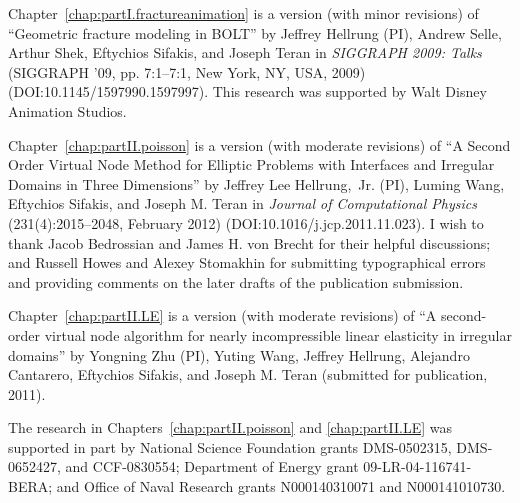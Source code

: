 {Chapter~\ref{chap:partI.fractureanimation} is a version (with minor revisions) of ``Geometric fracture modeling in BOLT'' by Jeffrey Hellrung (PI), Andrew Selle, Arthur Shek, Eftychios Sifakis, and Joseph Teran in \textit{SIGGRAPH 2009: Talks} (SIGGRAPH '09, pp. 7:1--7:1, New York, NY, USA, 2009) \linebreak[4] (DOI:10.1145/1597990.1597997). This research was supported by Walt Disney Animation Studios.

Chapter~\ref{chap:partII.poisson} is a version (with moderate revisions) of ``A Second Order Virtual Node Method for Elliptic Problems with Interfaces and Irregular Domains in Three Dimensions'' by Jeffrey Lee Hellrung,~Jr. (PI), Luming Wang, Eftychios Sifakis, and Joseph M. Teran in \textit{Journal of Computational Physics} (231(4):2015--2048, February 2012) (DOI:10.1016/j.jcp.2011.11.023). I wish to thank Jacob Bedrossian and James H. von Brecht for their helpful discussions; and Russell Howes and Alexey Stomakhin for submitting typographical errors and providing comments on the later drafts of the publication submission.

Chapter~\ref{chap:partII.LE} is a version (with moderate revisions) of ``A second-order virtual node algorithm for nearly incompressible linear elasticity in irregular domains'' by Yongning Zhu (PI), Yuting Wang, Jeffrey Hellrung, Alejandro Cantarero, Eftychios Sifakis, and Joseph M. Teran (submitted for publication, 2011).

The research in Chapters~\ref{chap:partII.poisson} and \ref{chap:partII.LE} was supported in part by National Science Foundation grants DMS-0502315, DMS-0652427, and CCF-0830554; Department of Energy grant 09-LR-04-116741-BERA; and Office of Naval Research grants N000140310071 and N000141010730.
}


